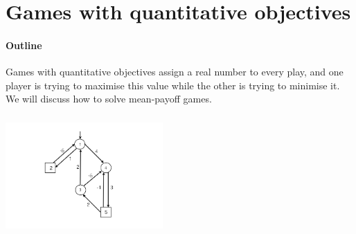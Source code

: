 \documentclass[a4paper,10pt]{article}
\begin{document}
% 
% 
% 
% 
% 
% 
% 
% 
% 
% 


 \section{Games with quantitative objectives}
\paragraph{Outline}
Games with quantitative objectives assign a real number to every play, and one player is trying to maximise this value while the other is trying to minimise it. We will discuss how to solve mean-payoff games.

\begin{center}\includegraphics[width=6cm,height=4.6cm]{mpg.png} \end{center}
\end{document}
